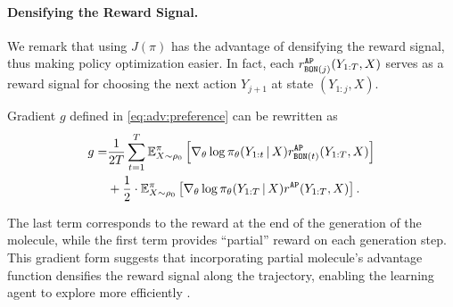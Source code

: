 \paragraph{Densifying the Reward Signal.}
We remark that using $J(\pi)$ has the advantage of densifying the reward signal, thus making policy optimization easier.
In fact, each $r_{{\mathtt{BON}}(j)}^{\mathtt{AP}}(Y_{1:T}, X)$ serves as a reward signal for choosing the next action $Y_{j+1}$ at state $(Y_{1:j}, X)$.
\begin{lemma}
\vspace{+0.2cm}
    \label{lem:gradient}
     Gradient $g$ defined in \eqref{eq:adv:preference} can be rewritten as
    \begin{align}
        g =& \frac {1} {2T} \sum_{t=1}^T \mathbb{E}_{X\sim\rho_0}^\pi \left[\nabla_\theta \log \pi_\theta(Y_{1:t}{\,|\,} X)  r_{{\mathtt{BON}}(t)}^{\mathtt{AP}}(Y_{1:T}, X)\right] \notag\\
        & +  \frac 1 2 \cdot \mathbb{E}_{X\sim\rho_0}^\pi \left[\nabla_\theta \log \pi_\theta(Y_{1:T}{\,|\,} X)  r^{\mathtt{AP}}(Y_{1:T}, X) \right]. \label{eq:grad_reform}
    \end{align}
\end{lemma}
The last term corresponds to the reward at the end of the generation of the molecule, while the first term provides ``partial'' reward on each generation step.
This gradient form suggests that incorporating partial molecule's advantage function densifies the reward signal along the trajectory, enabling the learning agent to explore more efficiently \citep{riedmiller2018learning, vecerik2017leveraging}. 
